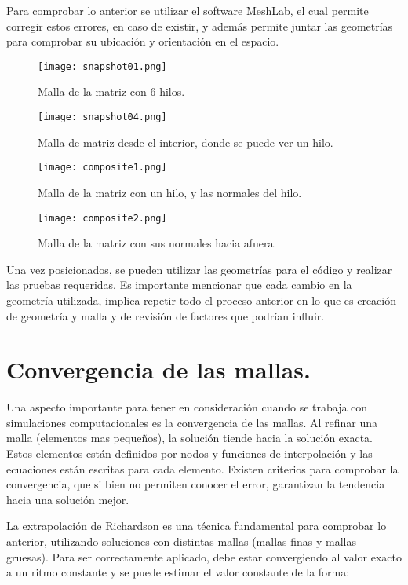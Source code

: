 \documentclass[12pt,letterpaper]{report}
\numberwithin{equation}{section}
\begin{document}
Para comprobar lo anterior se utilizar el software MeshLab, el cual permite corregir estos errores, en caso de existir, y además permite juntar las geometrías para comprobar su ubicación y orientación en el espacio.

\begin{figure}[H]
	\centering\texttt{[image: snapshot01.png]}
	\caption{Malla de la matriz con 6 hilos.}
\end{figure}

\begin{figure}[H]
	\centering\texttt{[image: snapshot04.png]}
	\caption{Malla de matriz desde el interior, donde se puede ver un hilo.}
\end{figure}

\begin{figure}[H]
	\centering\texttt{[image: composite1.png]}
	\caption{Malla de la matriz con un hilo, y las normales del hilo.}
\end{figure}

\begin{figure}[H]
	\centering\texttt{[image: composite2.png]}
	\caption{Malla de la matriz con sus normales hacia afuera.}
\end{figure}

Una vez posicionados, se pueden utilizar las geometrías para el código y realizar las pruebas requeridas. Es importante mencionar que cada cambio en la geometría utilizada, implica repetir todo el proceso anterior en lo que es creación de geometría y malla y de revisión de factores que podrían influir.

\section{Convergencia de las mallas.}

Una aspecto importante para tener en consideración cuando se trabaja con simulaciones computacionales es la convergencia de las mallas. Al refinar una malla (elementos mas pequeños), la solución tiende hacia la solución exacta. Estos elementos están definidos por nodos y funciones de interpolación y las ecuaciones están escritas para cada elemento. Existen criterios para comprobar la convergencia, que si bien no permiten conocer el error, garantizan la tendencia hacia una solución mejor.

La extrapolación de Richardson es una técnica fundamental para comprobar lo anterior, utilizando soluciones con distintas mallas (mallas finas y mallas gruesas). Para ser correctamente aplicado, debe estar convergiendo al valor exacto a un ritmo constante y se puede estimar el valor constante de la forma:
\end{document}
